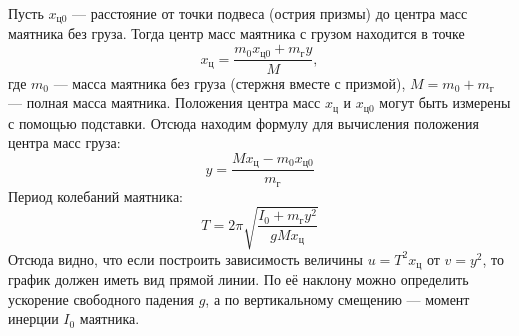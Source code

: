 \documentclass[12pt]{article}
\begin{document}
	Пусть $x_{\text{ц0}}$ --- расстояние от точки подвеса (острия	призмы) до центра масс маятника без груза. Тогда центр масс маятника с грузом находится в точке
	\begin{equation}\label{x_eq}
	x_{\text{ц}} = \frac{m_0x_{\text{ц0}} + m_{\text{г}}y}{M},
	\end{equation}
	где $m_0$ --- масса маятника без груза (стержня вместе с призмой), $M = m_0 + m_{\text{г}}$ --- полная масса маятника. Положения центра масс $	x_{\text{ц}}$ и $x_{\text{ц0}}$ могут быть измерены с
	помощью подставки. Отсюда находим формулу для вычисления положения центра масс груза:
	$$
	y = \frac{Mx_{\text{ц}} - m_0x_{\text{ц0}}}{m_{\text{г}}}
	$$
	Период колебаний маятника:
	\begin{equation}\label{T_eq}
	T = 2\pi\sqrt{\frac{I_0 + m_{\text{г}}y^2}{gMx_{\text{ц}}}}
	\end{equation}
	Отсюда видно, что если построить зависимость величины $u = T^2x_{\text{ц}}$ от $v = y^2$, то график должен иметь вид прямой линии. По её наклону можно определить ускорение свободного падения $g$, а по вертикальному смещению --- момент инерции $I_0$ маятника.
\end{document}
